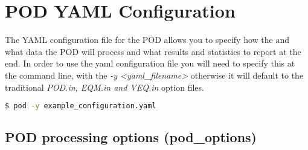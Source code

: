 \chapter{POD YAML Configuration}
\label{ch:pod_yaml_configuration}
The YAML configuration file for the POD allows you to specify how the and what data the POD will process and what results and statistics to report at the end.
In order to use the yaml configuration file you will need to specify this at the command line, with the \emph{-y <yaml\_filename>} otherwise it will default to the traditional \emph{POD.in, EQM.in and VEQ.in} option files.

\begin{lstlisting}[language=bash,caption=calling the yaml configuration file]
$ pod -y example_configuration.yaml
\end{lstlisting}

\section{POD processing options (pod\_options)}
%

